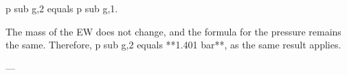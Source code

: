 p sub g,2 equals p sub g,1.  

The mass of the EW does not change, and the formula for the pressure remains the same. Therefore, p sub g,2 equals **1.401 bar**, as the same result applies.  

---